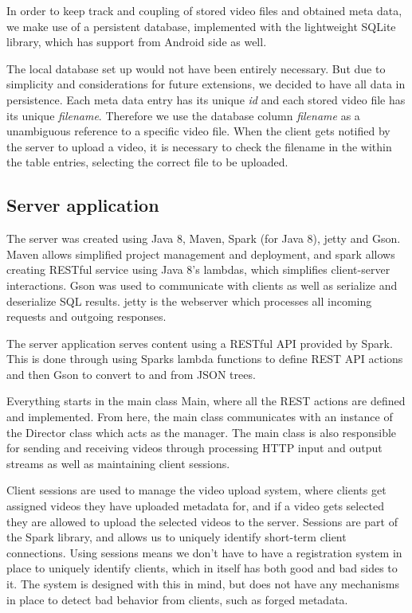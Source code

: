\documentclass[conference]{IEEEtran}
\begin{document}
In order to keep track and coupling of stored video files and obtained meta data, we make use of a persistent database,
implemented with the lightweight SQLite library, which has support from Android side as well.

The local database set up would not have been entirely necessary. 
But due to simplicity and considerations for future extensions, we decided to have all data in persistence.
Each meta data entry has its unique \textsl{id} and each stored video file has its unique \textsl{filename}.
Therefore we use the database column \textsl{filename} as a unambiguous reference to a specific video file.
When the client gets notified by the server to upload a video, it is necessary to check the filename in the within 
the table entries, selecting the correct file to be uploaded.


\subsection{Server application}

The server was created using Java 8, Maven, Spark (for Java 8), jetty and Gson. Maven allows simplified project
management and deployment, and spark allows creating RESTful service using Java 8's lambdas, which
simplifies client-server interactions. Gson was used to communicate with clients as well as serialize
and deserialize SQL results. jetty is the webserver which processes all incoming requests and outgoing responses.

The server application serves content using a RESTful API provided by Spark. This is done through using Sparks
lambda functions to define REST API actions and then Gson to convert to and from JSON trees.

Everything starts in the main class Main, where all the REST actions are defined and implemented. From here,
the main class communicates with an instance of the Director class which acts as the manager. The main
class is also responsible for sending and receiving videos through processing HTTP input and output streams
as well as maintaining client sessions.

Client sessions are used to manage the video upload system, where clients get assigned videos they have uploaded
metadata for, and if a video gets selected they are allowed to upload the selected videos to the server.
Sessions are part of the Spark library, and allows us to uniquely identify short-term client connections. Using
sessions means we don't have to have a registration system in place to uniquely identify clients, which in itself
has both good and bad sides to it. The system is designed with this in mind, but does not have any mechanisms in
place to detect bad behavior from clients, such as forged metadata.
\end{document}
